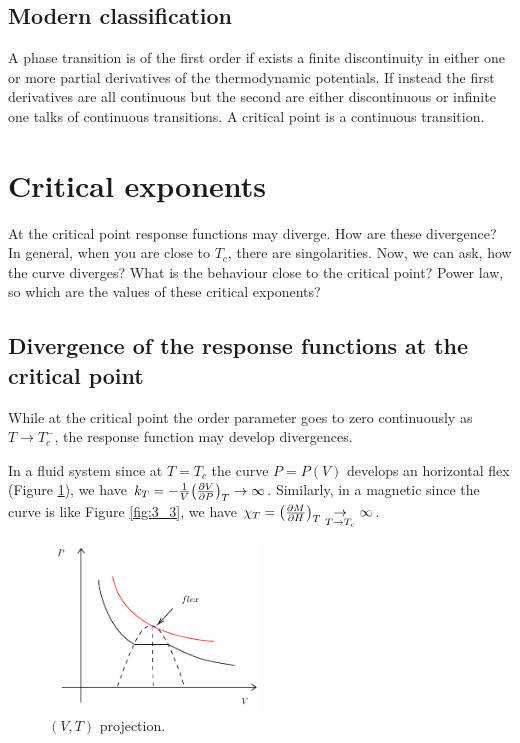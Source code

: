 \documentclass[../main/main.tex]{subfiles}
\begin{document}
\subsection{Modern classification}
A phase transition is of the first order if exists a finite discontinuity in either one or more partial derivatives of the thermodynamic potentials. If instead the first derivatives are all continuous but the second are either discontinuous or infinite one talks of continuous transitions.
A critical point is a continuous transition.




\section{Critical exponents}

At the critical point response functions may diverge. How are these divergence?
In general, when you are close to \( T_c \), there are singolarities. Now, we can ask, how the curve diverges? What is the behaviour close to the critical point? Power law, so which are the values of these critical exponents?

\subsection{Divergence of the response functions at the critical point}
While at the critical point the order parameter goes to zero continuously as \( T \rightarrow T_c^- \), the response function may develop divergences.
\begin{example}
In a fluid system since at \( T=T_c \) the curve \( P = P(V) \) develops an horizontal flex (Figure \ref{fig:3_2_2}), we have \( k_T = -\frac{1}{V} \qty(\pdv{V}{P} )_T  \rightarrow \infty  \). Similarly, in a magnetic since the curve is like Figure \ref{fig:3_3}, we have \( \chi _T = \qty(\pdv{M}{H} )_T \underset{T \rightarrow  T_c}{\rightarrow } \infty   \).

\begin{figure}[h!]
\centering
\includegraphics[width=0.5\textwidth]{../lessons/3_image/4.pdf}
\caption{\label{fig:3_2_2} \( (V,T) \) projection.  }
\end{figure}
\end{example}
\end{document}
